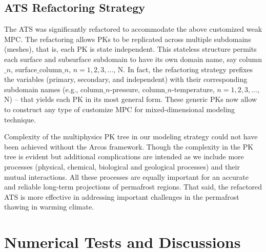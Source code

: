 \documentclass[review]{elsarticle}
\begin{document}

\subsection{ATS Refactoring Strategy}
The ATS was significantly refactored to accommodate the above customized weak MPC. The refactoring allows PKs to be replicated across multiple subdomains (meshes), that is, each PK is state independent. This stateless structure permits each surface and subsurface subdomain to have its own domain name, say 
column$\_n$, surface$\_$column$\_n$, $n=1,2,3, \dots$, N. In fact, the refactoring strategy prefixes the variables (primary, secondary, and independent) with their corresponding subdomain names (e.g., column$\_n$-pressure, column$\_n$-temperature, $n=1,2,3, \dots$, N) -- that yields each PK in its most general form. These generic PKs now allow to construct any type of customize MPC for mixed-dimensional modeling technique.

Complexity of the multiphysics PK tree in our modeling strategy could not have been achieved without the Arcos framework. Though the complexity in the PK tree is evident but additional complications are intended as we include more processes (physical, chemical, biological and geological processes) and their mutual interactions. All these processes are equally important for an accurate and reliable long-term projections of permafrost regions. That said, the refactored ATS is more effective in addressing important challenges in the permafrost thawing in warming climate.


\section{Numerical Tests and Discussions}\label{numerical-tests}
\end{document}
